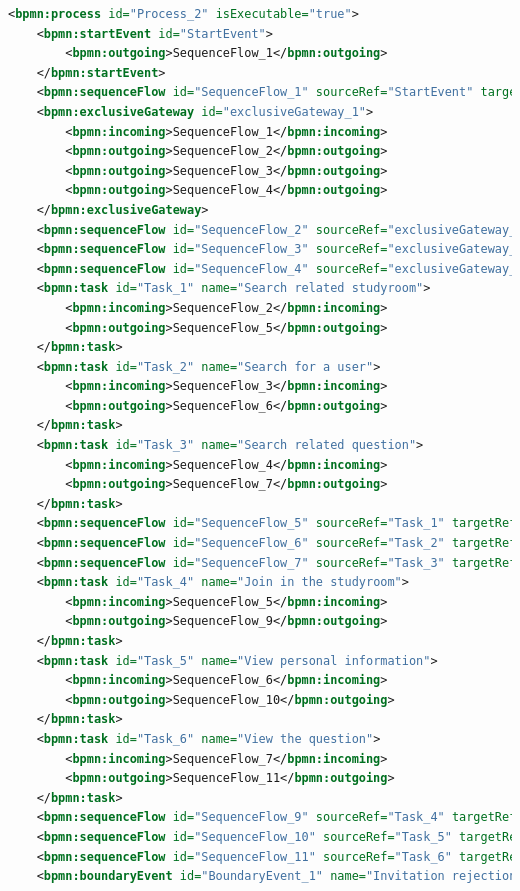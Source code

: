 \documentclass[runningheads]{llncs}
\begin{document}
\begin{lstlisting}[language={XML}]
<bpmn:process id="Process_2" isExecutable="true">
	<bpmn:startEvent id="StartEvent">
        <bpmn:outgoing>SequenceFlow_1</bpmn:outgoing>
    </bpmn:startEvent>
    <bpmn:sequenceFlow id="SequenceFlow_1" sourceRef="StartEvent" targetRef="exclusiveGateway_1" />
    <bpmn:exclusiveGateway id="exclusiveGateway_1">
        <bpmn:incoming>SequenceFlow_1</bpmn:incoming>
        <bpmn:outgoing>SequenceFlow_2</bpmn:outgoing>
        <bpmn:outgoing>SequenceFlow_3</bpmn:outgoing>
        <bpmn:outgoing>SequenceFlow_4</bpmn:outgoing>
    </bpmn:exclusiveGateway>
    <bpmn:sequenceFlow id="SequenceFlow_2" sourceRef="exclusiveGateway_1" targetRef="Task_1" />
    <bpmn:sequenceFlow id="SequenceFlow_3" sourceRef="exclusiveGateway_1" targetRef="Task_2" />
    <bpmn:sequenceFlow id="SequenceFlow_4" sourceRef="exclusiveGateway_1" targetRef="Task_3" />
    <bpmn:task id="Task_1" name="Search related studyroom">
        <bpmn:incoming>SequenceFlow_2</bpmn:incoming>
        <bpmn:outgoing>SequenceFlow_5</bpmn:outgoing>
    </bpmn:task>
    <bpmn:task id="Task_2" name="Search for a user">
        <bpmn:incoming>SequenceFlow_3</bpmn:incoming>
        <bpmn:outgoing>SequenceFlow_6</bpmn:outgoing>
    </bpmn:task>
    <bpmn:task id="Task_3" name="Search related question">
        <bpmn:incoming>SequenceFlow_4</bpmn:incoming>
        <bpmn:outgoing>SequenceFlow_7</bpmn:outgoing>
    </bpmn:task>
    <bpmn:sequenceFlow id="SequenceFlow_5" sourceRef="Task_1" targetRef="Task_4" />
    <bpmn:sequenceFlow id="SequenceFlow_6" sourceRef="Task_2" targetRef="Task_5" />
    <bpmn:sequenceFlow id="SequenceFlow_7" sourceRef="Task_3" targetRef="Task_5" />
    <bpmn:task id="Task_4" name="Join in the studyroom">
        <bpmn:incoming>SequenceFlow_5</bpmn:incoming>
        <bpmn:outgoing>SequenceFlow_9</bpmn:outgoing>
    </bpmn:task>
    <bpmn:task id="Task_5" name="View personal information">
        <bpmn:incoming>SequenceFlow_6</bpmn:incoming>
        <bpmn:outgoing>SequenceFlow_10</bpmn:outgoing>
    </bpmn:task>
    <bpmn:task id="Task_6" name="View the question">
        <bpmn:incoming>SequenceFlow_7</bpmn:incoming>
        <bpmn:outgoing>SequenceFlow_11</bpmn:outgoing>
    </bpmn:task>
    <bpmn:sequenceFlow id="SequenceFlow_9" sourceRef="Task_4" targetRef="EndEvent_3" />
    <bpmn:sequenceFlow id="SequenceFlow_10" sourceRef="Task_5" targetRef="Task_7" />
    <bpmn:sequenceFlow id="SequenceFlow_11" sourceRef="Task_6" targetRef="exclusiveGateway_2" />
    <bpmn:boundaryEvent id="BoundaryEvent_1" name="Invitation rejection" attachedToRef="Task_4">

\end{lstlisting}
\end{document}
